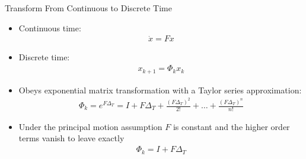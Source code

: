 \documentclass[hyperref={pdfpagelabels=false}]{beamer}
\begin{document}
\begin{frame}{Transform From Continuous to Discrete Time}
\begin{itemize}
\item Continuous time:
\begin{align*}
\dot{x} = Fx
\end{align*}
\item Discrete time:
\begin{align*}
x_{k+1} = \Phi_kx_k
\end{align*}
\item Obeys exponential matrix transformation with a Taylor series approximation:
\begin{align*}
\Phi_k = e^{F\Delta_T} = I + F\Delta_T + \frac{(F\Delta_T)^2}{2!} + \ldots + \frac{(F\Delta_T)^n}{n!}
\end{align*}
\item Under the principal motion assumption $F$ is constant and the higher order terms vanish to leave exactly 
\begin{align*}
\Phi_k = I + F\Delta_T
\end{align*}
\end{itemize}
\end{frame}
\end{document}
